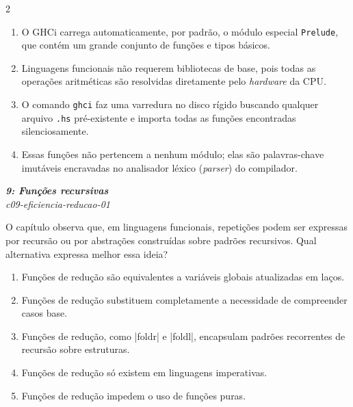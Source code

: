 \documentclass[a4paper,10pt,brazil]{article}
\begin{document}
\begin{multicols}{2}
\begin{enumerate}
  \item O GHCi carrega automaticamente, por padrão, o módulo especial \texttt{Prelude}, que contém um grande conjunto de funções e tipos básicos.

  \item Linguagens funcionais não requerem bibliotecas de base, pois todas as operações aritméticas são resolvidas diretamente pelo \emph{hardware} da CPU.

  \item O comando \texttt{ghci} faz uma varredura no disco rígido buscando qualquer arquivo \texttt{.hs} pré-existente e importa todas as funções encontradas silenciosamente.

  \item Essas funções não pertencem a nenhum módulo; elas são palavras-chave imutáveis encravadas no analisador léxico (\emph{parser}) do compilador.


\end{enumerate}

\begin{flushright}
  \footnotesize
  \textit{\textbf{9: Funções recursivas}}\\
  \textit{c09-eficiencia-reducao-01}\\

\end{flushright}
O capítulo observa que, em linguagens funcionais, repetições podem ser expressas por recursão ou por abstrações construídas sobre padrões recursivos. Qual alternativa expressa melhor essa ideia?

\begin{enumerate}
  \item Funções de redução são equivalentes a variáveis globais atualizadas em laços.

  \item Funções de redução substituem completamente a necessidade de compreender casos base.

  \item Funções de redução, como \haskellinline|foldr| e \haskellinline|foldl|, encapsulam padrões recorrentes de recursão sobre estruturas.

  \item Funções de redução só existem em linguagens imperativas.

  \item Funções de redução impedem o uso de funções puras.


\end{enumerate}


\end{multicols}
\end{document}
